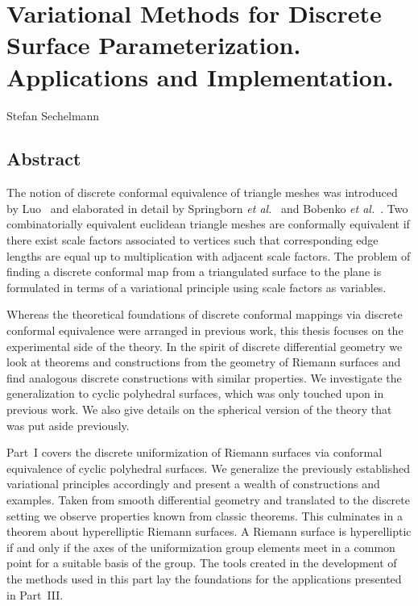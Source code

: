\documentclass[Thesis.tex]{subfiles}
\begin{document}
\section*{Variational Methods for Discrete Surface Parameterization. Applications and Implementation.}
Stefan Sechelmann
\subsection*{Abstract}

The notion of discrete conformal equivalence of triangle meshes was introduced by Luo~\cite{Luo2004:Yamabe} and elaborated in detail by Springborn {\it et al.}~\cite{Springborn2008} and Bobenko {\it et al.}~\cite{BPS2015:dconf}. 
Two combinatorially equivalent euclidean triangle meshes are conformally equivalent if there exist scale factors associated to vertices such that corresponding edge lengths are equal up to multiplication with adjacent scale factors.
The problem of finding a discrete conformal map from a triangulated surface to the plane is formulated in terms of a variational principle using scale factors as variables.

Whereas the theoretical foundations of discrete conformal mappings via discrete conformal equivalence were arranged in previous work, this thesis focuses on the experimental side of the theory. 
In the spirit of discrete differential geometry we look at theorems and constructions from the geometry of Riemann surfaces and find analogous discrete constructions with similar properties.
We investigate the generalization to cyclic polyhedral surfaces, which was only touched upon in previous work.
We also give details on the spherical version of the theory that was put aside previously.


Part~I covers the discrete uniformization of Riemann surfaces via conformal equivalence of cyclic polyhedral surfaces.
We generalize the previously established variational principles accordingly and present a wealth of constructions and examples. 
Taken from smooth differential geometry and translated to the discrete setting we observe properties known from classic theorems. 
This culminates in a theorem about hyperelliptic Riemann surfaces.
A Riemann surface is hyperelliptic if and only if the axes of the uniformization group elements meet in a common point for a suitable basis of the group.
The tools created in the development of the methods used in this part lay the foundations for the applications presented in Part~III.
\end{document}
